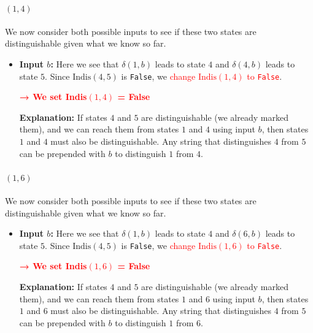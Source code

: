 \documentclass{article}
\begin{document}
\paragraph{$(1, 4)$} We now consider both possible inputs to see if these two states are distinguishable given what we know so far.
\begin{itemize}[itemsep=0.3em]

\item \textbf{Input $b$:} Here we see that $\delta(1, b)$ leads to state $4$ and $\delta(4, b)$ leads to state $5$.
  Since $\text{Indis}(4, 5)$ is \texttt{False}, we \textcolor{red}{change $\text{Indis}(1, 4)$ to \texttt{False}}.
  
  \textcolor{red}{\textbf{→ We set Indis$(1, 4)$ = False}}
  
  \textbf{Explanation:} If states $4$ and $5$ are distinguishable (we already marked them), and we can reach them from states $1$ and $4$ using input $b$, then states $1$ and $4$ must also be distinguishable. Any string that distinguishes $4$ from $5$ can be prepended with $b$ to distinguish $1$ from $4$.
\end{itemize}
\paragraph{$(1, 6)$} We now consider both possible inputs to see if these two states are distinguishable given what we know so far.
\begin{itemize}[itemsep=0.3em]

\item \textbf{Input $b$:} Here we see that $\delta(1, b)$ leads to state $4$ and $\delta(6, b)$ leads to state $5$.
  Since $\text{Indis}(4, 5)$ is \texttt{False}, we \textcolor{red}{change $\text{Indis}(1, 6)$ to \texttt{False}}.
  
  \textcolor{red}{\textbf{→ We set Indis$(1, 6)$ = False}}
  
  \textbf{Explanation:} If states $4$ and $5$ are distinguishable (we already marked them), and we can reach them from states $1$ and $6$ using input $b$, then states $1$ and $6$ must also be distinguishable. Any string that distinguishes $4$ from $5$ can be prepended with $b$ to distinguish $1$ from $6$.
\end{itemize}
\end{document}
